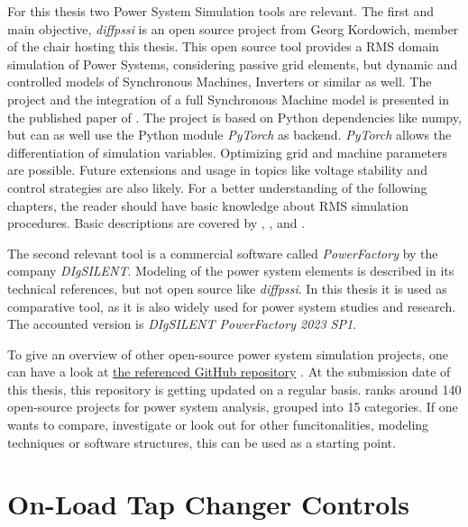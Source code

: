 For this thesis two Power System Simulation tools are relevant.
The first and main objective, \textit{diffpssi} is an open source project from Georg Kordowich, member of the chair hosting this thesis.
This open source tool provides a \acs{RMS} domain simulation of Power Systems, considering passive grid elements, but dynamic and controlled models of Synchronous Machines, Inverters or similar as well.
The project and the integration of a full Synchronous Machine model is presented in the published paper of \textcite{kordowich_2023}.
The project is based on Python dependencies like numpy, but can as well use the Python module \textit{PyTorch} as backend.
\textit{PyTorch} allows the differentiation of simulation variables.
Optimizing grid and machine parameters are possible. 
Future extensions and usage in topics like voltage stability and control strategies are also likely.
For a better understanding of the following chapters, the reader should have basic knowledge about \acs{RMS} simulation procedures.
Basic descriptions are covered by \textcite{kundur_2022}, \textcite{machowski_2020}, and \textcite{milano_2010}.

The second relevant tool is a commercial software called \textit{PowerFactory} by the company \textit{DIgSILENT}.
Modeling of the power system elements is described in its technical references, but not open source like \textit{diffpssi}.
In this thesis it is used as comparative tool, as it is also widely used for power system studies and research.
The accounted version is \textit{DIgSILENT PowerFactory 2023 SP1}.

To give an overview of other open-source power system simulation projects, one can have a look at \href{https://github.com/ps-wiki/best-of-ps}{the referenced GitHub repository} \autocite{jinningwang_2025}.
At the submission date of this thesis, this repository is getting updated on a regular basis.
\textcite{jinningwang_2025} ranks around 140 open-source projects for power system analysis, grouped into 15 categories.
If one wants to compare, investigate or look out for other funcitonalities, modeling techniques or software structures, this can be used as a starting point.
        
\section{On-Load Tap Changer Controls}

